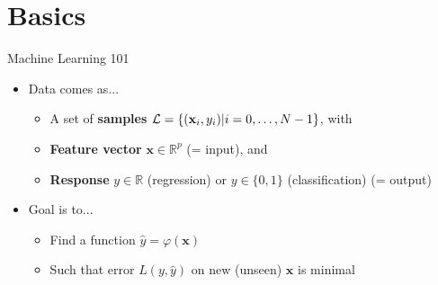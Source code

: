 \documentclass{beamer}
\begin{document}


\section{Basics}

\begin{frame}{Machine Learning 101}
  \begin{itemize}
  \item Data comes as...
    \begin{itemize}
        \vspace{0.2cm}
        \item A set of {\bf samples} ${\cal L} = \{(\mathbf{x}_i, y_i) | i = 0, \dots, N-1 \}$, with
        \vspace{0.2cm}
        \item {\bf Feature vector} $\mathbf{x} \in \mathbb{R}^p$ (= input), and
        \vspace{0.2cm}
        \item {\bf Response} $y \in \mathbb{R}$ (regression) or $y \in \{0, 1\}$ (classification) (= output)
    \end{itemize}
  \vspace{0.5cm}
  \item Goal is to...
    \begin{itemize}
        \vspace{0.2cm}
        \item Find a function $\hat{y} = \varphi(\mathbf{x})$
        \vspace{0.2cm}
        \item Such that error $L(y, \hat{y})$ on new (unseen) $\mathbf{x}$ is minimal
        \vspace{0.5cm}
    \end{itemize}
  \end{itemize}
\end{frame}


\end{document}
